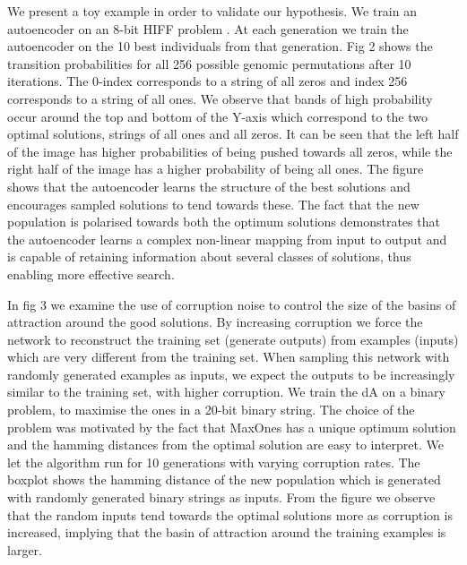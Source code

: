 \documentclass[runningheads,a4paper]{llncs}
\begin{document}
We present a toy example in order to validate our hypothesis. We train an autoencoder on an 8-bit HIFF problem \cite{Watson}. At each generation we train the autoencoder on the 10 best individuals from that generation. Fig 2 shows the transition probabilities for all 256 possible genomic permutations after 10 iterations. The 0-index corresponds to a string of all zeros and index 256 corresponds to a string of all ones. We observe that bands of high probability occur around the top and bottom of the Y-axis which correspond to the two optimal solutions, strings of all ones and all zeros. It can be seen that the left half of the image has higher probabilities of being pushed towards all zeros, while the right half of the image has a higher probability of being all ones.
The figure shows that the autoencoder learns the structure of the best solutions and encourages sampled solutions to tend towards these. The fact that the new population is polarised towards both the optimum solutions demonstrates that the autoencoder learns a complex non-linear mapping from input to output and is capable of retaining information about several classes of solutions, thus enabling more effective search.

In fig 3 we examine the use of corruption noise to control the size of the basins of attraction around the good solutions. By increasing corruption we force the network to reconstruct the training set (generate outputs) from examples (inputs) which are very different from the training set. When sampling this network with randomly generated examples as inputs, we expect the outputs to be increasingly similar to the training set, with higher corruption. We train the dA on a binary problem, to maximise the ones in a 20-bit binary string. The choice of the problem was motivated by the fact that MaxOnes has a unique optimum solution and the hamming distances from the optimal solution are easy to interpret. We let the algorithm run for 10 generations with varying corruption rates. The boxplot shows the hamming distance of the new population which is generated with randomly generated binary strings as inputs. From the figure we observe that the random inputs tend towards the optimal solutions more as corruption is increased, implying that the basin of attraction around the training examples is larger.





\end{document}

